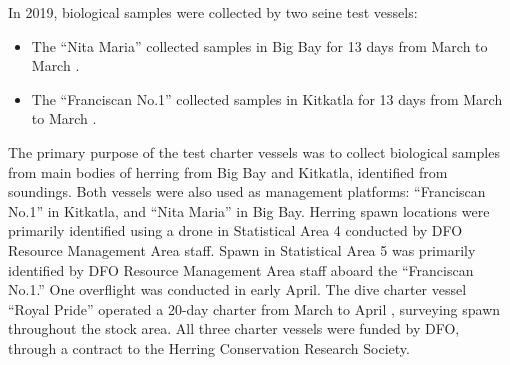 In 2019, biological samples were collected by two seine test vessels:
\begin{itemize}
\item The ``Nita Maria'' collected samples in Big Bay for 13 days from March  to March .
\item The ``Franciscan No.1'' collected samples in Kitkatla for 13 days from March  to March .
\end{itemize}
The primary purpose of the test charter vessels was to collect biological samples from main bodies of herring from Big Bay and Kitkatla, identified from soundings.
Both vessels were also used as management platforms: ``Franciscan No.1'' in Kitkatla, and ``Nita Maria'' in Big Bay. 
Herring spawn locations were primarily identified using a drone in Statistical Area 4 conducted by DFO Resource Management Area staff.
Spawn in Statistical Area 5 was primarily identified by DFO Resource Management Area staff aboard the ``Franciscan No.1.''
One overflight was conducted in early April.
The dive charter vessel ``Royal Pride'' operated a 20-day charter from March  to April , surveying spawn throughout the stock area.
All three charter vessels were funded by DFO, through a contract to the Herring Conservation Research Society.